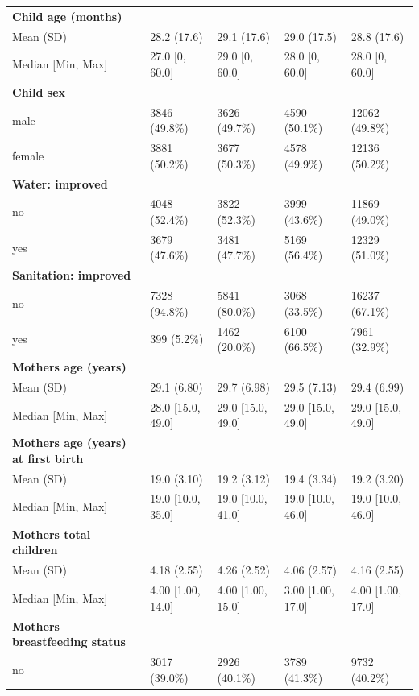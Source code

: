 \documentclass[a4paper, 11pt]{article} %
\begin{document}
\begin{table}[!htbp]
{{\begin{tabular}{lllll}
    \textbf{Child age (months)} & & & &  \\						
    Mean (SD) &	28.2 (17.6) &	29.1 (17.6) &	29.0 (17.5) & 28.8 (17.6) \\
    Median [Min, Max] &	27.0 [0, 60.0] &	29.0 [0, 60.0] & 28.0 [0, 60.0]	& 28.0 [0, 60.0] \\ \hline
    \textbf{Child sex} & & & &  \\						
    male &	3846 (49.8\%) &	3626 (49.7\%) &	4590 (50.1\%) & 12062 (49.8\%) \\
    female &	3881 (50.2\%) &	3677 (50.3\%) &	4578 (49.9\%) & 12136 (50.2\%) \\ \hline
    \textbf{Water: improved} & & & &  \\						
    no &	4048 (52.4\%) &	3822 (52.3\%) &	3999 (43.6\%) & 11869 (49.0\%) \\
    yes &	3679 (47.6\%) &	3481 (47.7\%) &	5169 (56.4\%) & 12329 (51.0\%) \\ \hline
    \textbf{Sanitation: improved} & & & &  \\						
    no &	7328 (94.8\%) &	5841 (80.0\%) &	3068 (33.5\%) & 16237 (67.1\%) \\
    yes &	399 (5.2\%) &	1462 (20.0\%) &	6100 (66.5\%) & 7961 (32.9\%) \\ \hline
    \textbf{Mothers age (years)} & & & &  \\						
    Mean (SD) &	29.1 (6.80) &	29.7 (6.98) &	29.5 (7.13) & 29.4 (6.99) \\
    Median [Min, Max] &	28.0 [15.0, 49.0] & 29.0 [15.0, 49.0] &	29.0 [15.0, 49.0] &	29.0 [15.0, 49.0] \\ \hline
    \textbf{Mothers age (years) at first birth} & & & &  \\						
    Mean (SD) &	19.0 (3.10) &	19.2 (3.12) &	19.4 (3.34) & 19.2 (3.20) \\
    Median [Min, Max] &	19.0 [10.0, 35.0] & 19.0 [10.0, 41.0] &	19.0 [10.0, 46.0] &	19.0 [10.0, 46.0] \\ \hline
    \textbf{Mothers total children} & & & &  \\						
    Mean (SD) &	4.18 (2.55) &	4.26 (2.52) &	4.06 (2.57) & 4.16 (2.55) \\
    Median [Min, Max] &	4.00 [1.00, 14.0] & 4.00 [1.00, 15.0] &	3.00 [1.00, 17.0] &	4.00 [1.00, 17.0] \\ \hline
    \textbf{Mothers breastfeeding status} & & & &  \\						
    no &	3017 (39.0\%) &	2926 (40.1\%) &	3789 (41.3\%) & 9732 (40.2\%) \\

\end{tabular}}}
\end{table}
\end{document}
